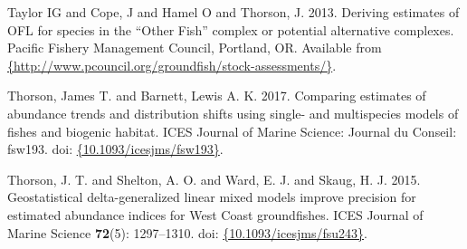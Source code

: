 \documentclass[12pt,]{article}
\begin{document}
\leavevmode\hypertarget{ref-Taylor2013}{}%
Taylor IG and Cope, J and Hamel O and Thorson, J. 2013. Deriving
estimates of OFL for species in the ``Other Fish'' complex or potential
alternative complexes. Pacific Fishery Management Council, Portland, OR.
Available from
\href{\%7Bhttp://www.pcouncil.org/groundfish/stock-assessments/\%7D}{\{http://www.pcouncil.org/groundfish/stock-assessments/\}}.

\leavevmode\hypertarget{ref-Thorson2017a}{}%
Thorson, James T. and Barnett, Lewis A. K. 2017. Comparing estimates of
abundance trends and distribution shifts using single- and multispecies
models of fishes and biogenic habitat. ICES Journal of Marine Science:
Journal du Conseil: fsw193. doi:
\href{https://doi.org/\%7B10.1093/icesjms/fsw193\%7D}{\{10.1093/icesjms/fsw193\}}.

\leavevmode\hypertarget{ref-Thorson2015}{}%
Thorson, J. T. and Shelton, A. O. and Ward, E. J. and Skaug, H. J. 2015.
Geostatistical delta-generalized linear mixed models improve precision
for estimated abundance indices for West Coast groundfishes. ICES
Journal of Marine Science \textbf{72}(5): 1297--1310. doi:
\href{https://doi.org/\%7B10.1093/icesjms/fsu243\%7D}{\{10.1093/icesjms/fsu243\}}.
\end{document}
